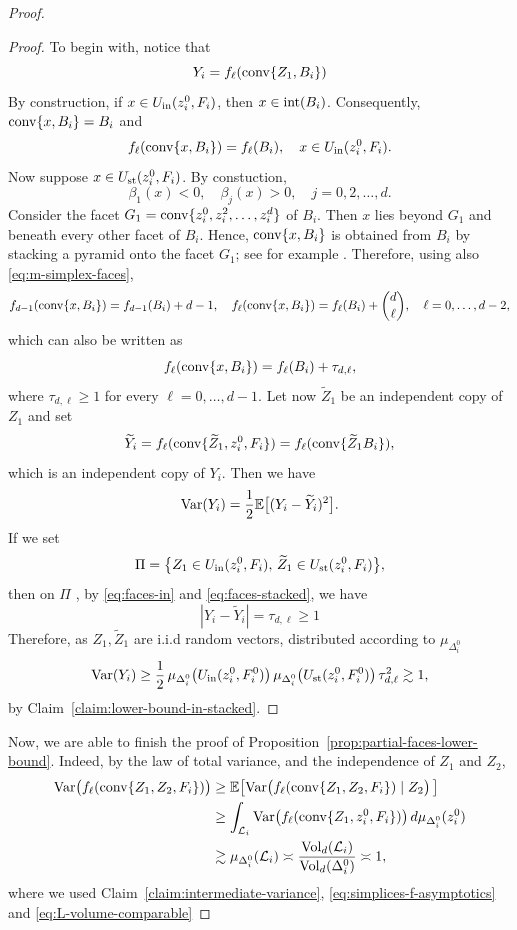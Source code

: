 \documentclass[10pt]{amsart}
\newcommand{\1}{\textbf{1}}
\newcommand{\conv}{{\rm conv}}
\newcommand{\vol}{{\rm Vol}}
\newcommand{\Var}{{\rm Var}}
\numberwithin{equation}{section} %
\theoremstyle{remark}
\theoremstyle{definition}
\begin{document}
\begin{proof}
\begin{proof}
     To begin with, notice that \[Y_i=f_\ell(\conv\{Z_1,B_i\})\]By construction, if $x \in U_{\rm in}(z_i^0,F_i)$, then $x \in {\rm int}(B_i)$. Consequently, $\conv\{x,B_i\}=B_i$ and \begin{equation}\label{eq:faces-in}       
    f_\ell(\conv\{x,B_i\})=f_\ell(B_i), \quad x \in U_{\rm in}(z_i^0,F_i).
    \end{equation}
    Now suppose $x \in U_{\rm st}(z_i^0,F_i)$. By constuction, \[\beta_1(x)<0, \quad \beta_j(x)>0, \quad j=0,2,\ldots,d.\] Consider the facet $G_1=\conv\{z_i^0,z_i^2,\ldots,z_i^d\}$ of $B_i$. Then $x$ lies beyond $G_1$ and beneath every other facet of $B_i$. Hence, $\conv\{x,B_i\}$ is obtained from $B_i$ by stacking a pyramid onto the facet $G_1$; see for example \cite[\S 2.4]{Ziegler}. Therefore, using also \eqref{eq:m-simplex-faces},
    \[f_{d-1}(\conv\{x,B_i\})=f_{d-1}(B_i)+d-1, \quad f_{\ell}(\conv\{x,B_i\})=f_{\ell}(B_i)+\binom{d}{\ell}, \quad \ell=0,\ldots,d-2,\] which can also be written as \begin{equation}\label{eq:faces-stacked}f_{\ell}(\conv\{x,B_i\})=f_\ell(B_i)+\tau_{d,\ell}, 
    \end{equation}
    where $\tau_{d,\ell} \geq 1$ for every $\ell=0,\ldots,d-1$. Let now $\widetilde{Z}_1$ be an independent copy of $Z_1$ and set \[ \widetilde{Y}_i=f_\ell(\conv\{\widetilde{Z}_1,z_i^0,F_i\})=f_\ell(\conv\{\widetilde{Z}_1B_i\}),\] which is an independent copy of $Y_i$. Then we have 
        \[
            \Var(Y_i)=\frac{1}{2}\mathbb{E}\bigl[(Y_i-\widetilde{Y}_i)^2\bigr].
        \] If we set \[\Pi=\bigl\{Z_1 \in U_{\rm in}(z_i^0,F_i), \, \widetilde{Z}_1 \in  U_{\rm st}(z_i^0,F_i)\bigr\} ,\] then on $\Pi$ , by \eqref{eq:faces-in} and \eqref{eq:faces-stacked}, we have \[|Y_i -\widetilde{Y}_i|=\tau_{d,\ell} \geq 1\] Therefore, as $Z_1,\widetilde{Z}_1$ are i.i.d random vectors, distributed according to $\mu_{\Delta_i^0}$ \[
            \Var(Y_i) \geq \frac{1}{2}\,\mu_{\Delta_i^0}\bigl(U_{\rm in}(z_i^0,F_i^0)\bigr)\,\mu_{\Delta_i^0}\bigl(U_{\rm st}(z_i^0,F_i^0)\bigr)\,\tau_{d,\ell}^2 \gtrsim 1,
        \] by Claim~\ref{claim:lower-bound-in-stacked}.  
\end{proof}

Now, we are able to finish the proof of Proposition~\ref{prop:partial-faces-lower-bound}. Indeed,  by the law of total variance, and the independence of $Z_1$ and $Z_2$, \begin{align*}
        \Var \bigl(f_\ell(\conv\{Z_1,Z_2,F_i\})\bigr)&\geq \mathbb{E}\bigl[\Var\bigl(f_\ell(\conv\{Z_1,Z_2,F_i\})\mid Z_2\bigr)\,\bigr]\\
        &\geq\int_{\mathcal{L}_i} \Var\bigl(f_\ell(\conv\{Z_1,z_i^0,F_i\})\bigr)\, d\mu_{\Delta_i^0}(z_i^0)\\
        &\gtrsim\mu_{\Delta_i^0}(\mathcal{L}_i)  \asymp \frac{\vol_d(\mathcal{L}_i)}{\vol_d(\Delta_i^0)}\asymp 1,
        \end{align*} where we used Claim~\ref{claim:intermediate-variance}, \eqref{eq:simplices-f-asymptotics} and \eqref{eq:L-volume-comparable}
\end{proof}
\end{document}
